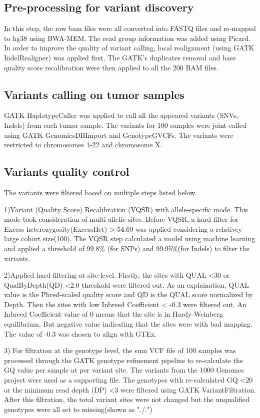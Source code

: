 \subsection{Pre-processing for variant discovery} 
In this step, the raw bam files were all converted into FASTQ files and re-mapped to hg38 using BWA-MEM. The read group information was added using Picard. In order to improve the quality of variant calling, local realignment (using GATK IndelRealigner) was applied first. The GATK's duplicates removal and base quality score recalibration were then applied to all the 200 BAM files.

\subsection{Variants calling on tumor samples} 
GATK HaplotypeCaller was applied to call all the appeared variants (SNVs, Indels) from each tumor sample. The variants for 100 samples were joint-called using GATK GenomicsDBImport and GenotypeGVCFs. The variants were restricted to chromosomes 1-22 and chromosome X. 

\subsection{Variants quality control}
The variants were filtered based on multiple steps listed below. 

1)Variant (Quality Score) Recalibration (VQSR) with allele-specific mode. This mode took consideration of multi-allelic sites. Before VQSR, a hard filter for Excess heterozygosity(ExcessHet) > 54.69 was applied considering a relativey large cohort size(100). The VQSR step calculated a model using machine learning and applied a threshold of 99.8\% (for SNPs) and 99.95\%(for Indels) to filter the variants.

2)Applied hard-filtering at site-level. Firstly, the sites with QUAL <30 or QualByDepth(QD) <2.0 threshold were filtered out. As an explaination, QUAL value is the Phred-scaled quality score and QD is the QUAL score normalized by Depth. Then the sites with low Inbreed Coefficient < -0.3 were filtered out. An Inbreed Coefficient value of 0 means that the site is in Hardy-Weinberg equilibrium. But negative value indicating that the sites were with bad mapping. The value of -0.3 was chosen to align with GTEx.

3) For filtration at the genotype level, the sum VCF file of 100 samples was processed through the GATK genotype refinement pipeline to re-calculate the GQ value per sample at per variant site. The variants from the 1000 Genomes project were used as a supporting file. The genotypes with re-calculated GQ <20 or the minimum read depth (DP) <3 were filtered using GATK VariantFiltration. After this filtration, the total variant sites were not changed but the unqualified genotypes were all set to missing(shown as "./.")

